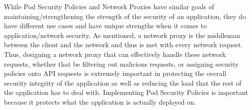 While Pod Security Policies and Network Proxies have similar goals of maintaining/strengthening the strength of the
security of an application, they do have different use cases and have unique strengths when it comes to application/network security.
As mentioned, a network proxy is the middleman between the client and the network and thus is met with every network request.
Thus, designing a network proxy that can effectively handle these network requests, whether that be filtering out malicious requests, or
assigning security policies onto API requests is extremely important in protecting the overall security integrity of the application
as well as reducing the load that the rest of the application has to deal with. Implementing Pod Security Policies is important because
it protects what the application is actually deployed on.
